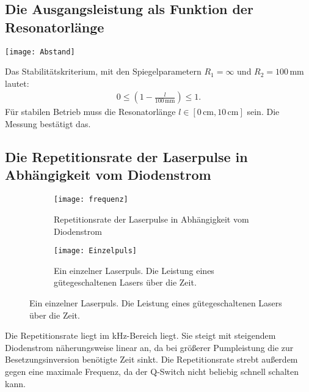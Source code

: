 \documentclass[a0paper,portrait]{baposter}
\begin{document}
\begin{poster}
{\subsection*{Die Ausgangsleistung als Funktion der Resonatorlänge}
\begin{minipage}{0.5\textwidth}
\texttt{[image: Abstand]} 
\end{minipage}
\begin{minipage}{0.5\textwidth}
Das Stabilitätskriterium, mit den Spiegelparametern $R_1=\infty$ und $R_2=100\,\text{mm}$ lautet:
\begin{align*}
0\leq \left(1-\frac{l}{100\,\text{mm}}\right)\leq 1.
\end{align*}
Für stabilen Betrieb muss die Resonatorlänge $
l\in\left[0\,\text{cm},10\,\text{cm}\right]$ sein. Die Messung bestätigt das. 
\end{minipage}
\subsection*{Die Repetitionsrate der Laserpulse in Abhängigkeit
vom Diodenstrom}
\begin{figure}[H]
\centering
\begin{subfigure}{0.45\textwidth}
\texttt{[image: frequenz]} 
\caption{Repetitionsrate der Laserpulse in Abhängigkeit
vom Diodenstrom}
\label{bla}
\end{subfigure} %
\begin{subfigure}{0.45\textwidth}
\centering
\texttt{[image: Einzelpuls]} 
\caption{Ein einzelner Laserpuls. Die Leistung eines gütegeschaltenen Lasers über die Zeit. }
\end{subfigure}
\end{figure}

Die Repetitionsrate liegt im kHz-Bereich liegt. 
Sie steigt mit steigendem Diodenstrom näherungsweise linear an, da bei größerer Pumpleistung die zur Besetzungsinversion benötigte Zeit sinkt.
Die Repetitionsrate strebt außerdem gegen eine maximale Frequenz, da der Q-Switch nicht beliebig schnell schalten kann.

}


\end{poster}
\end{document}
